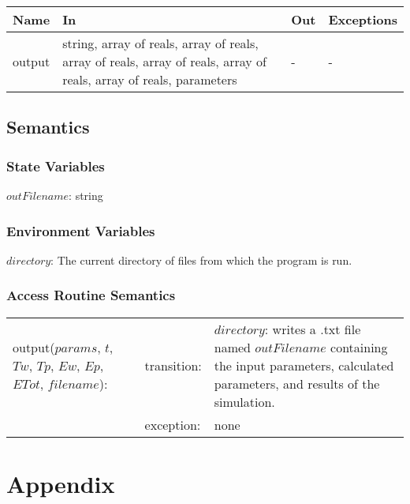 \documentclass[12pt]{article}
\begin{document}
\begin{center}
\begin{tabular}{p{3cm} p{7cm} p{2cm} p{2cm}}
\hline
\textbf{Name} & \textbf{In} & \textbf{Out} & \textbf{Exceptions} \\
\hline
output & string, array of reals, array of reals, array of reals, array of reals, array of reals, array of reals, parameters & - & - \\
\hline
\end{tabular}
\end{center}

\subsection{Semantics}

\subsubsection{State Variables}

$outFilename$: string

\subsubsection{Environment Variables}

$directory$: The current directory of files from which the program is run.

\subsubsection{Access Routine Semantics}

\begin{center}
\begin{tabular}{l l p{4cm}}
output($params$, $t$, $Tw$, $Tp$, $Ew$, $Ep$, $ETot$, $filename$): & transition: & $directory$: writes a .txt file named $outFilename$ containing the input parameters, calculated parameters, and results of the simulation. \\
& exception: & none \\
\end{tabular}
\end{center}

\section{Appendix} \label{Appendix}

\renewcommand{\arraystretch}{1.2}
\end{document}
